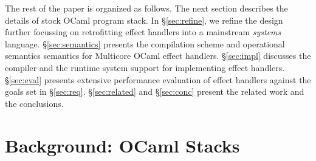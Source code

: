 \documentclass[sigplan,10pt,review,anonymous]{acmart}\settopmatter{printfolios=true,printccs=false,printacmref=false}
\begin{document}
The rest of the paper is organized as follows. The next section describes the
details of stock OCaml program stack. In \S\ref{sec:refine}, we refine the
design further focussing on retrofitting effect handlers into a mainstream
\emph{systems} language. \S\ref{sec:semantics} presents the compilation scheme
and operational semantics semantics for Multicore OCaml effect handlers.
\S\ref{sec:impl} discusses the compiler and the runtime system support for
implementing effect handlers. \S\ref{sec:eval} presents extensive performance
evaluation of effect handlers against the goals set in \S\ref{sec:req}.
\S\ref{sec:related} and \S\ref{sec:conc} present the related work and the
conclusions.

\section{Background: OCaml Stacks}
\label{sec:stack}
\end{document}
